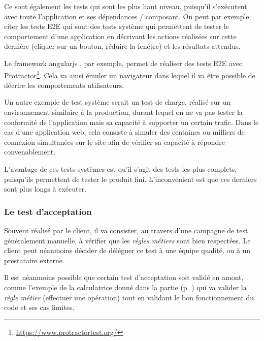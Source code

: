 Ce sont également les tests qui sont les plus haut niveau, puisqu'il s'exécutent avec toute l'application et ses dépendances / composant. On peut par exemple citer les tests \gls{E2E} qui sont des tests système  qui permettent de tester le comportement d'une application en décrivant les actions réalisées sur cette dernière (cliquer sur un bouton, réduire la fenêtre) et les résultats attendus.

Le \gls{framework} \gls{angularjs} , par exemple, permet de réaliser des tests \gls{E2E} avec Protractor\footnote{\url{https://www.protractortest.org/}}. Cela va ainsi émuler un navigateur dans lequel il va être possible de décrire les comportements utilisateurs. 

Un autre exemple de test système serait un test de charge, réalisé sur un environnement similaire à la production, durant lequel on ne va pas tester la conformité de l'application mais sa capacité à supporter un certain trafic. Dans le cas d'une application web, cela consiste à simuler des centaines ou milliers de connexion simultanées sur le site afin de vérifier sa capacité à répondre convenablement. 

L'avantage de ces tests systèmes est qu'il s'agit des tests les plus complets, puisqu'ils permettent de tester le produit fini. L'inconvénient est que ces derniers sont plus longs à exécuter.


\subsubsection{Le test d'acceptation}\label{test-acceptation}

Souvent réalisé par le client, il va consister, au travers d'une campagne de test généralement manuelle, à vérifier que les \emph{règles métiers} sont bien respectées. Le client peut néanmoins décider de déléguer ce test à une équipe qualité, ou à un prestataire externe.

Il est néanmoins possible que certain test d'acceptation soit validé en amont, comme l'exemple de la calculatrice donné dans la partie  (p. \pageref{test-composant}) qui va valider la \emph{règle métier} (effectuer une opération) tout en validant le bon fonctionnement du code et ses cas limites.


